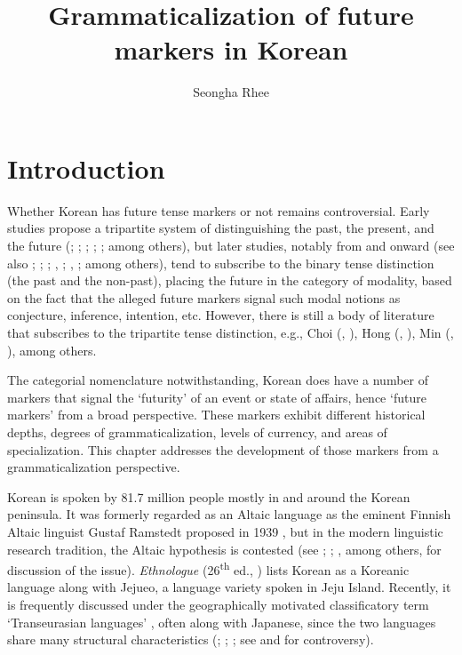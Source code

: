 \documentclass[output=paper,colorlinks,citecolor=brown]{langscibook}
\author{Seongha Rhee\orcid{}\affiliation{Faculty of Liberal Arts, Mahidol University}}
\title{Grammaticalization of future markers in Korean}
\begin{document}
\maketitle

\section{Introduction}

Whether Korean has future tense markers or not remains controversial. Early studies propose a tripartite system of distinguishing the past, the present, and the future (\cite{Joo1910}; \cite{Park1972}; \cite{Choe1937}; \cite{Hong1947}; \cite{Yoo1956}; among others), but later studies, notably from \citet{Ko1965} and onward (see also \cite{Nam1972}; \cite{Sohn1975}; \cite{Sung1976}; \cite{Suh1976}, \citeyear{Suh1977}; \cite{Mun2005}, \citeyear{Mun2009}; among others), tend to subscribe to the binary tense distinction (the past and the non-past), placing the future in the category of modality, based on the fact that the alleged future markers signal such modal notions as conjecture, inference, intention, etc. However, there is still a body of literature that subscribes to the tripartite tense distinction, e.g., Choi (\citeyear{Choi1995}, \citeyear{Choi1996}), Hong (\citeyear{Hong1987}, \citeyear{Hong2008}), Min (\citeyear{Min1991}, \citeyear{Min1998}), among others. 

The categorial nomenclature notwithstanding, Korean does have a number of markers that signal the ‘futurity’ of an event or state of affairs, hence ‘future markers’ from a broad perspective. These markers exhibit different historical depths, degrees of grammaticalization, levels of currency, and areas of specialization. This chapter addresses the development of those markers from a grammaticalization perspective. 

Korean is spoken by 81.7 million people \citep{Eberhard2023} mostly in and around the Korean peninsula. It was formerly regarded as an Altaic language as the eminent Finnish Altaic linguist Gustaf Ramstedt proposed in 1939 \citep{Ramstedt1997}, but in the modern linguistic research tradition, the Altaic hypothesis is contested (see \cite{Kim1992}; \cite{Sohn1999}; \cite{Song2005}, among others, for discussion of the issue). \textit{Ethnologue} (26\textsuperscript{th} ed., \cite{Eberhard2023}) lists Korean as a Koreanic language along with Jejueo, a language variety spoken in Jeju Island. Recently, it is frequently discussed under the geographically motivated classificatory term ‘Transeurasian languages’ \citep{Johanson2010}, often along with Japanese, since the two languages share many structural characteristics (\cite{NarrogRhee2013}; \cite{Narrog2018}; \cite{Robbeets2021}; see \cite{Tian2022} and \cite{Robbeets2022} for controversy). 
\end{document}
